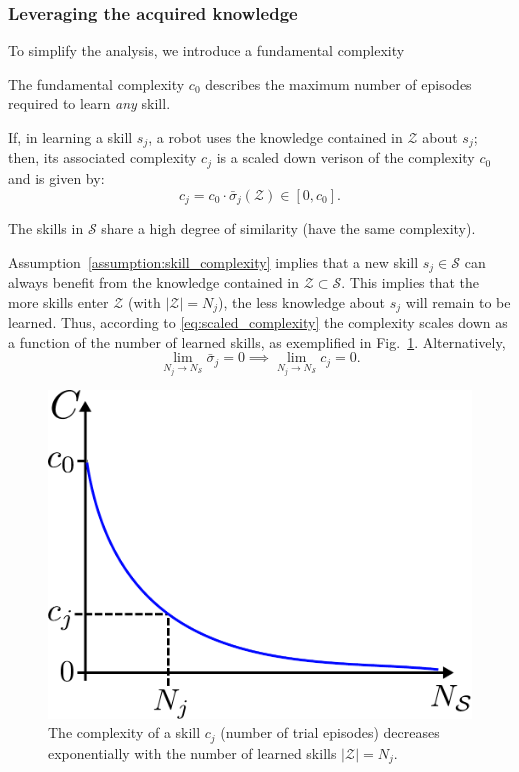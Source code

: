 \subsubsection{\textbf{Leveraging the acquired knowledge}}
To simplify the analysis, we introduce a fundamental complexity
\begin{tcolorbox}
\begin{assumption}\label{definition:joint_grouping} The fundamental complexity $c_0$ describes the maximum number of episodes required to learn \emph{any} skill.
\end{assumption}
\end{tcolorbox}
If, in learning a skill $ s_j $, a robot uses the knowledge contained in $\mathcal{Z}$ about $s_j$; then, its associated complexity $ c_j $ is a scaled down verison of the complexity $c_{0}$ and is given by:
\begin{equation}\label{eq:scaled_complexity}
c_j = c_{0} \cdot \bar{\sigma}_{j}\left(\mathcal{Z}\right)\in [0, c_{0}].
\end{equation}
\begin{tcolorbox}
	\begin{assumption}\label{assumption:skill_complexity}
		The skills in $ \mathcal{S} $ share a high degree of similarity (have the same complexity).
	\end{assumption}
\end{tcolorbox}
Assumption~\ref{assumption:skill_complexity} implies that a new skill $s_j \in \mathcal{S}$ can always benefit from the knowledge contained in $\mathcal{Z} \subset \mathcal{S}$. This implies that the more skills enter $\mathcal{Z}$ (with $|\mathcal{Z}| = N_j$), the less knowledge about $ s_j $ will remain to be learned. Thus, according to \eqref{eq:scaled_complexity} the complexity scales down as a function of the number of learned skills, as exemplified in Fig.~\ref{fig:complexity_per_cardinality}. Alternatively,
\begin{equation}\label{eq:knowledge_limit}
    \lim_{N_{j}\to N_{\mathcal{S}}} \bar{\sigma}_j = 0 \implies \lim_{N_{j}\to N_{\mathcal{S}}} c_j = 0.
\end{equation}
\begin{figure}[!ht]
	\centering
	\includegraphics[width=0.7\columnwidth]{fig/complexity_per_cardinality.pdf}
	\caption{The complexity of a skill $c_j$ (number of trial episodes) decreases exponentially with the number of learned skills $|\mathcal{Z}|=N_{j}$.}
	\label{fig:complexity_per_cardinality}
\end{figure}
